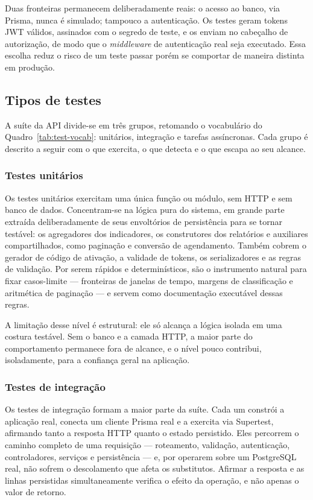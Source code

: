 Duas fronteiras permanecem deliberadamente reais: o acesso ao banco, via
Prisma, nunca é simulado; tampouco a autenticação. Os testes geram tokens JWT
válidos, assinados com o segredo de teste, e os enviam no cabeçalho de
autorização, de modo que o \textit{middleware} de autenticação real seja
executado. Essa escolha reduz o risco de um teste passar porém se comportar de
maneira distinta em produção.

\subsection{Tipos de testes}\label{sec:test-api-tipos}

A suíte da API divide-se em três grupos, retomando o vocabulário do
Quadro~\ref{tab:test-vocab}: unitários, integração e tarefas assíncronas. Cada
grupo é descrito a seguir com o que exercita, o que detecta e o que escapa ao
seu alcance.

\subsubsection{Testes unitários}

Os testes unitários exercitam uma única função ou módulo, sem HTTP e sem banco
de dados. Concentram-se na lógica pura do sistema, em grande parte extraída
deliberadamente de seus envoltórios de persistência para se tornar testável: os
agregadores dos indicadores, os construtores dos relatórios e auxiliares
compartilhados, como paginação e conversão de agendamento. Também cobrem o
gerador de código de ativação, a validade de tokens, os serializadores e as
regras de validação. Por serem rápidos e determinísticos, são o instrumento
natural para fixar casos-limite --- fronteiras de janelas de tempo, margens de
classificação e aritmética de paginação --- e servem como documentação
executável dessas regras.

A limitação desse nível é estrutural: ele só alcança a lógica isolada em uma
costura testável. Sem o banco e a camada HTTP, a maior parte do comportamento
permanece fora de alcance, e o nível pouco contribui, isoladamente, para a
confiança geral na aplicação.

\subsubsection{Testes de integração}

Os testes de integração formam a maior parte da suíte. Cada um constrói a
aplicação real, conecta um cliente Prisma real e a exercita via Supertest,
afirmando tanto a resposta HTTP quanto o estado persistido. Eles percorrem o
caminho completo de uma requisição --- roteamento, validação, autenticação,
controladores, serviços e persistência --- e, por operarem sobre um PostgreSQL
real, não sofrem o descolamento que afeta os substitutos. Afirmar a resposta e
as linhas persistidas simultaneamente verifica o efeito da operação, e não
apenas o valor de retorno.

